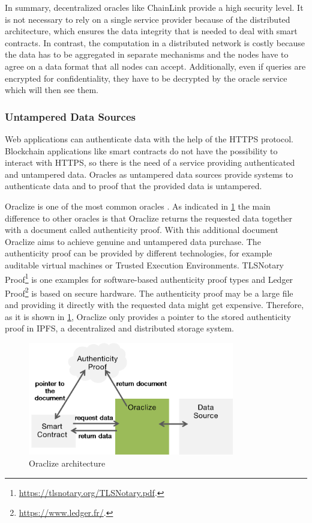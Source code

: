 \documentclass[conference]{IEEEtran}
\begin{document}
In summary, decentralized oracles like ChainLink provide a high security level. It is not necessary to rely on a single service provider because of the distributed architecture, which ensures the data integrity that is needed to deal with smart contracts. In contrast, the computation in a distributed network is costly because the data has to be aggregated in separate mechanisms and the nodes have to agree on a data format that all nodes can accept. Additionally, even if queries are encrypted for confidentiality, they have to be decrypted by the oracle service which will then see them. \cite{Ellis2017} \cite{Oraclize2017}
\subsubsection{Untampered Data Sources}
Web applications can authenticate data with the help of the HTTPS protocol. Blockchain applications like smart contracts do not have the possibility to interact with HTTPS, so there is the need of a service providing authenticated and untampered data. Oracles as untampered data sources provide systems to authenticate data and to proof that the provided data is untampered. \cite{Oraclize2017} \par 
Oraclize is one of the most common oracles \cite{Bartoletti2017}. As indicated in \ref{oraclize} the main difference to other oracles is that Oraclize returns the requested data together with a document called authenticity proof. With this additional document Oraclize aims to achieve genuine and untampered data purchase. The authenticity proof can be provided by different technologies, for example auditable virtual machines or Trusted Execution Environments. TLSNotary Proof\footnote{\url{https://tlsnotary.org/TLSNotary.pdf}.} is one examples for software-based authenticity proof types and Ledger Proof\footnote{\url{https://www.ledger.fr/}.} is based on secure hardware. The authenticity proof may be a large file and providing it directly with the requested data might get expensive. Therefore, as it is shown in \ref{oraclize}, Oraclize only provides a pointer to the stored authenticity proof in IPFS, a decentralized and distributed storage system. \cite{Oraclize2017} \par
\begin{figure}[h]
	\begin{center}
		\includegraphics[width=9cm]{Oraclize.png}
		\caption{Oraclize architecture}
		\label{oraclize}
	\end{center}
\end{figure}
\end{document}
